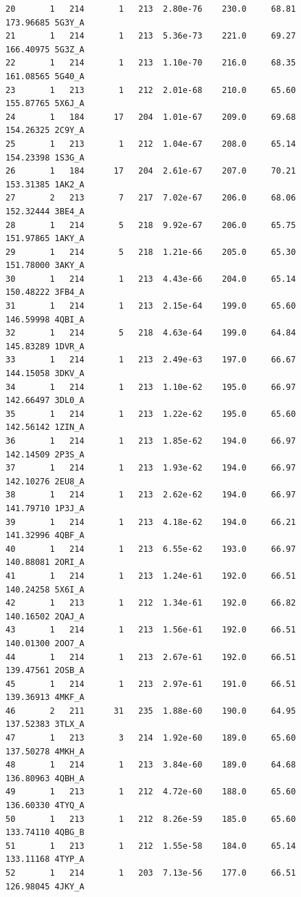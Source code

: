 \documentclass[
  letterpaper,
  DIV=11,
  numbers=noendperiod]{scrartcl}
\begin{document}
\begin{verbatim}
20       1   214       1   213  2.80e-76    230.0     68.81   173.96685 5G3Y_A
21       1   214       1   213  5.36e-73    221.0     69.27   166.40975 5G3Z_A
22       1   214       1   213  1.10e-70    216.0     68.35   161.08565 5G40_A
23       1   213       1   212  2.01e-68    210.0     65.60   155.87765 5X6J_A
24       1   184      17   204  1.01e-67    209.0     69.68   154.26325 2C9Y_A
25       1   213       1   212  1.04e-67    208.0     65.14   154.23398 1S3G_A
26       1   184      17   204  2.61e-67    207.0     70.21   153.31385 1AK2_A
27       2   213       7   217  7.02e-67    206.0     68.06   152.32444 3BE4_A
28       1   214       5   218  9.92e-67    206.0     65.75   151.97865 1AKY_A
29       1   214       5   218  1.21e-66    205.0     65.30   151.78000 3AKY_A
30       1   214       1   213  4.43e-66    204.0     65.14   150.48222 3FB4_A
31       1   214       1   213  2.15e-64    199.0     65.60   146.59998 4QBI_A
32       1   214       5   218  4.63e-64    199.0     64.84   145.83289 1DVR_A
33       1   214       1   213  2.49e-63    197.0     66.67   144.15058 3DKV_A
34       1   214       1   213  1.10e-62    195.0     66.97   142.66497 3DL0_A
35       1   214       1   213  1.22e-62    195.0     65.60   142.56142 1ZIN_A
36       1   214       1   213  1.85e-62    194.0     66.97   142.14509 2P3S_A
37       1   214       1   213  1.93e-62    194.0     66.97   142.10276 2EU8_A
38       1   214       1   213  2.62e-62    194.0     66.97   141.79710 1P3J_A
39       1   214       1   213  4.18e-62    194.0     66.21   141.32996 4QBF_A
40       1   214       1   213  6.55e-62    193.0     66.97   140.88081 2ORI_A
41       1   214       1   213  1.24e-61    192.0     66.51   140.24258 5X6I_A
42       1   213       1   212  1.34e-61    192.0     66.82   140.16502 2QAJ_A
43       1   214       1   213  1.56e-61    192.0     66.51   140.01300 2OO7_A
44       1   214       1   213  2.67e-61    192.0     66.51   139.47561 2OSB_A
45       1   214       1   213  2.97e-61    191.0     66.51   139.36913 4MKF_A
46       2   211      31   235  1.88e-60    190.0     64.95   137.52383 3TLX_A
47       1   213       3   214  1.92e-60    189.0     65.60   137.50278 4MKH_A
48       1   214       1   213  3.84e-60    189.0     64.68   136.80963 4QBH_A
49       1   213       1   212  4.72e-60    188.0     65.60   136.60330 4TYQ_A
50       1   213       1   212  8.26e-59    185.0     65.60   133.74110 4QBG_B
51       1   213       1   212  1.55e-58    184.0     65.14   133.11168 4TYP_A
52       1   214       1   203  7.13e-56    177.0     66.51   126.98045 4JKY_A

\end{verbatim}
\end{document}
